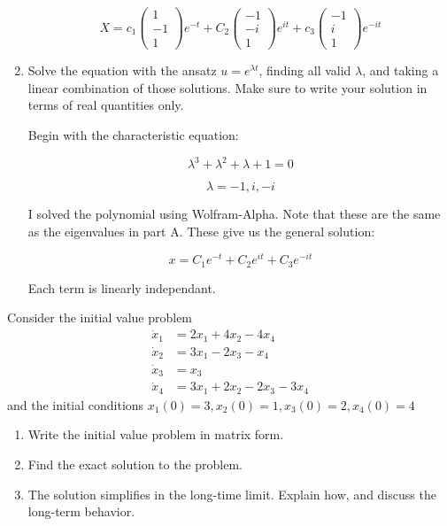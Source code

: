 \documentclass[11pt,answers]{exam}
\begin{document}
\begin{questions}
\begin{enumerate}
\begin{solution}
$$X = c_1\left(\begin{array}{ccc} 1 \\ -1 \\ 1 \end{array}\right)e^{-t} + C_2\left(\begin{array}{ccc} -1 \\ -i \\ 1 \end{array}\right)e^{it} + c_3\left(\begin{array}{ccc} -1 \\ i \\ 1 \end{array}\right)e^{-it}$$

\end{solution}

\item Solve the equation with the ansatz $u = e^{\lambda t}$, finding all valid $\lambda$, and taking a linear combination of those solutions.  Make sure to write your solution in terms of real quantities only.

\begin{solution}

Begin with the characteristic equation:

$$\lambda^3 + \lambda^2 + \lambda + 1 = 0$$

$$\lambda = -1,i,-i$$

I solved the polynomial using Wolfram-Alpha. Note that these are the same as the eigenvalues in part A. These give us the general solution:

$$x = C_1e^{-t} + C_2e^{it} + C_3e^{-it}$$

Each term is linearly independant. 

\end{solution}

\end{enumerate}


\item Consider the initial value problem
\begin{align*}
\dot{x}_1 &= 2x_1 + 4x_2 - 4x_4 \\
\dot{x}_2 &= 3x_1 - 2x_3 - x_4\\
\dot{x}_3 &= x_3 \\
\dot{x}_4 &= 3x_1 + 2x_2 - 2x_3 - 3x_4
\end{align*}
and the initial conditions $x_1(0) = 3, x_2(0) = 1, x_3(0) = 2, x_4(0) = 4$
\begin{enumerate}
\item Write the initial value problem in matrix form.
\item Find the exact solution to the problem.
\item The solution simplifies in the long-time limit. Explain how, and discuss the long-term behavior.
\end{enumerate}


\end{questions}
\end{document}
